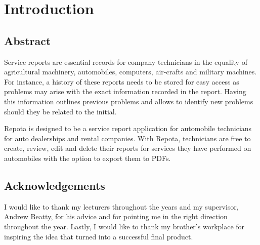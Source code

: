 \chapter{Introduction}

\section{Abstract}
Service reports are essential records for company technicians in the equality of agricultural machinery, automobiles, computers, air-crafts and military machines. For instance, a history of these reports needs to be stored for easy access as problems may arise with the exact information recorded in the report. Having this information outlines previous problems and allows to identify new problems should they be related to the initial. 

Repota is designed to be a service report application for automobile technicians for auto dealerships and rental companies. With Repota, technicians are free to create, review, edit and delete their reports for services they have performed on automobiles with the option to export them to PDFs.

\section{Acknowledgements}
 I would like to thank my lecturers throughout the years and my supervisor, Andrew Beatty, for his advice and for pointing me in the right direction throughout the year. Lastly, I would like to thank my brother's workplace for inspiring the idea that turned into a successful final product.

